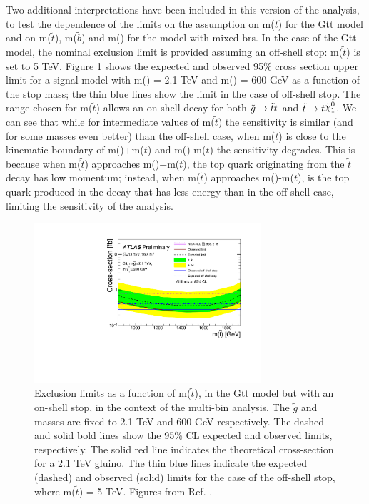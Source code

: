 Two additional interpretations have been included in this version of the analysis, to test the dependence of the limits on the 
assumption on m($\tilde{t}$) for the Gtt model and on m($\tilde{t}$), m($\tilde{b}$) and m(\chinoonepm) for the model with mixed \glspl{br}.
In the case of the Gtt model, the nominal exclusion limit is provided assuming an off-shell stop: m($\tilde{t}$) is set to 5 TeV.
Figure \ref{fig:limits_GttOnshell} shows the expected and observed 95\% cross section upper limit for a signal model with 
m(\gluino) = 2.1 TeV and m(\ninoone) = 600 GeV as a function of the stop mass; the thin blue lines 
show the limit in the case of off-shell stop. 
The range chosen for  m($\tilde{t}$) allows an on-shell decay for both 
$\tilde{g} \to \tilde{t}t$ and $\tilde{t} \to t \ninoone$. 
We can see that while for intermediate values of m($\tilde{t}$) the sensitivity is similar (and for some masses even better) 
than the off-shell case, when m($\tilde{t}$) is close to the kinematic boundary of 
m(\ninoone)+m($t$) and m(\gluino)-m($t$) the sensitivity degrades. 
This is because when m($\tilde{t}$) approaches m(\ninoone)+m($t$), the top quark originating from the $\tilde{t}$ decay 
has low momentum; instead, when m($\tilde{t}$) approaches m(\gluino)-m($t$), is the top quark produced in the \gluino 
decay that has less energy than in the off-shell case, limiting the sensitivity of the analysis. 


\begin{figure}
  \centering
  \includegraphics[width=0.75\textwidth]{figures/strong_prod/R21/multibin/Gtt_2100_600_onshell}
  \caption{Exclusion limits as a function of m($\tilde{t}$), in the Gtt model but with an on-shell stop, in the context of the multi-bin analysis. The $\tilde{g}$ and \ninoone masses are fixed to 2.1 TeV and 600 GeV respectively. The dashed and solid bold lines
    show the 95\% CL expected and observed limits, respectively. The solid red line indicates the theoretical cross-section for a 2.1 TeV gluino. The thin blue lines indicate the expected (dashed) and observed (solid) limits for the case of the off-shell stop, where m($\tilde{t}$) = 5 TeV.
    Figures from Ref. \cite{ATLAS-CONF-2018-041}.}
  \label{fig:limits_GttOnshell}
\end{figure}

